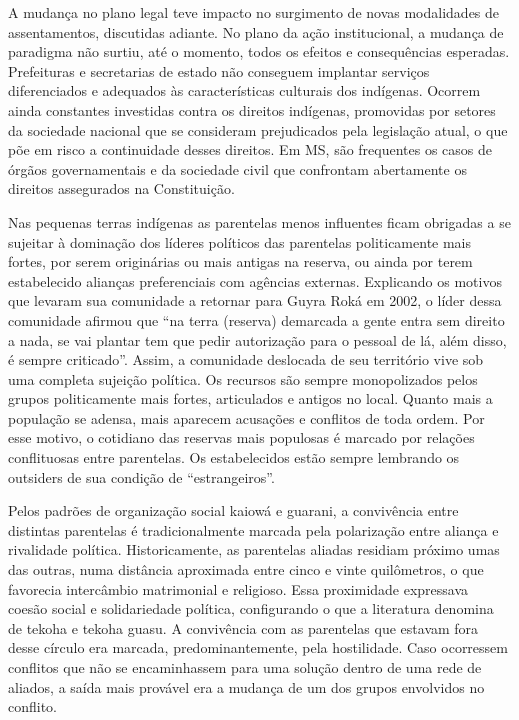 \documentclass{article}
\begin{document}
A mudan\c{c}a no plano legal teve impacto no surgimento de novas
modalidades de assentamentos, discutidas adiante. No plano da
a\c{c}\~ao institucional, a mudan\c{c}a de paradigma n\~ao surtiu,
at\'e o momento, todos os efeitos e consequ\^encias esperadas.
Prefeituras e secretarias de estado n\~ao conseguem implantar
servi\c{c}os diferenciados e adequados \`as caracter\'isticas culturais
dos ind\'igenas. Ocorrem ainda constantes investidas contra os direitos
ind\'igenas, promovidas por setores da sociedade nacional que se
consideram prejudicados pela legisla\c{c}\~ao atual, o que p\~oe em
risco a continuidade desses direitos. Em MS, s\~ao frequentes os casos
de \'org\~aos governamentais e da sociedade civil que confrontam
abertamente os direitos assegurados na Constitui\c{c}\~ao.

Nas pequenas terras ind\'igenas as parentelas menos influentes ficam
obrigadas a se sujeitar \`a domina\c{c}\~ao dos l\'ideres pol\'iticos
das parentelas politicamente mais fortes, por serem origin\'arias ou
mais antigas na reserva, ou ainda por terem estabelecido alian\c{c}as
preferenciais com ag\^encias externas. Explicando os motivos que
levaram sua comunidade a retornar para Guyra Rok\'a em 2002, o l\'ider
dessa comunidade afirmou que {\textquotedblleft}na terra (reserva)
demarcada a gente entra sem direito a nada, se vai plantar tem que
pedir autoriza\c{c}\~ao para o pessoal de l\'a, al\'em disso, \'e
sempre criticado{\textquotedblright}. Assim, a comunidade deslocada de
seu territ\'orio vive sob uma completa sujei\c{c}\~ao pol\'itica. Os
recursos s\~ao sempre monopolizados pelos grupos politicamente mais
fortes, articulados e antigos no local. Quanto mais a popula\c{c}\~ao
se adensa, mais aparecem acusa\c{c}\~oes e conflitos de toda ordem. Por
esse motivo, o cotidiano das reservas mais populosas \'e marcado por
rela\c{c}\~oes conflituosas entre parentelas. Os estabelecidos est\~ao
sempre lembrando os outsiders de sua condi\c{c}\~ao de
{\textquotedblleft}estrangeiros{\textquotedblright}. 

Pelos padr\~oes de organiza\c{c}\~ao social kaiow\'a e guarani, a
conviv\^encia entre distintas parentelas \'e tradicionalmente marcada
pela polariza\c{c}\~ao entre alian\c{c}a e rivalidade pol\'itica.
Historicamente, as parentelas aliadas residiam pr\'oximo umas das
outras, numa dist\^ancia aproximada entre cinco e vinte quil\^ometros,
o que favorecia interc\^ambio matrimonial e religioso. Essa proximidade
expressava coes\~ao social e solidariedade pol\'itica, configurando o
que a literatura denomina de tekoha e tekoha guasu. A conviv\^encia com
as parentelas que estavam fora desse c\'irculo era marcada,
predominantemente, pela hostilidade. Caso ocorressem conflitos que
n\~ao se encaminhassem para uma solu\c{c}\~ao dentro de uma rede de
aliados, a sa\'ida mais prov\'avel era a mudan\c{c}a de um dos grupos
envolvidos no conflito.
\end{document}
